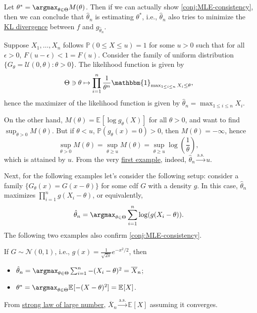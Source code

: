 Let \(\theta ^{\ast} = \argmax_{\theta \in \Theta } M(\theta )\). Then if we can actually show \autoref{conj:MLE-consistency}, then we can conclude that \(\hat{\theta} _n\) is estimating \(\theta ^{\ast} \), i.e., \(\hat{\theta} _n\) also tries to minimize the \href{https://en.wikipedia.org/wiki/Kullback%E2%80%93Leibler_divergence}{KL divergence} between \(f\) and \(g_{\hat{\theta} _n}\).

\begin{eg}
	Suppose \(X_1, \dots , X_n\) follows \(\mathbb{P} (0 \leq X \leq u) = 1\) for some \(u > 0\) such that for all \(\epsilon >0\), \(F(u - \epsilon ) < 1 = F(u)\). Consider the family of uniform distribution \(\{ G_\theta = \mathcal{U} (0, \theta ) \colon \theta > 0\} \). The likelihood function is given by
	\[
		\Theta \ni \theta
		\mapsto \prod_{i=1}^{n} \frac{1}{\theta ^n} \mathbbm{1}_{\max _{1 \leq i \leq n} X_i \leq \theta },
	\]
	hence the maximizer of the likelihood function is given by \(\hat{\theta} _n = \max _{1 \leq i \leq n} X_i\).

	On the other hand, \(M(\theta ) = \mathbb{E}_{}[\log g_\theta (X)] \) for all \(\theta  > 0\), and want to find \(\sup _{\theta > 0} M(\theta )\). But if \(\theta < u\), \(\mathbb{P} (g_\theta (x) = 0) > 0\), then \(M(\theta ) = -\infty \), hence
	\[
		\sup _{\theta > 0} M(\theta )
		= \sup _{\theta \geq u} M(\theta )
		= \sup _{\theta \geq u} \log (\frac{1}{\theta }),
	\]
	which is attained by \(u\). From the very \hyperref[eg:supremum-estimation]{first example}, indeed, \(\hat{\theta} _n \overset{\text{a.s.} }{\to} u\).
\end{eg}

Next, for the following examples let's consider the following setup: consider a family \(\{ G_\theta (x) = G(x - \theta ) \}\) for some cdf \(G\) with a density \(g\). In this case, \(\hat{\theta} _n\) maximizes \(\prod_{i=1}^{n} g(X_i - \theta )\), or equivalently,
\[
	\hat{\theta} _n
	= \argmax_{\theta \in \Theta } \sum_{i=1}^{n} \log (g(X_i - \theta )).
\]
The following two examples also confirm \autoref{conj:MLE-consistency}.

\begin{eg}[Normal]
	If \(G \sim \mathcal{N} (0, 1)\), i.e., \(g(x) = \frac{1}{\sqrt{2\pi } } e^{- x^2 / 2}\), then
	\begin{itemize}
		\item \(\hat{\theta} _n = \argmax_{\theta \in \Theta } \sum_{i=1}^{n} - (X_i - \theta )^2 = \overline{X} _n\);
		\item \(\theta ^{\ast} = \argmax_{\theta \in \Theta } \mathbb{E}_{}[-(X - \theta )^2] = \mathbb{E}_{}[X] \).
	\end{itemize}
	From \hyperref[thm:SLLN]{strong law of large number}, \(\overline{X} _n \overset{\text{a.s.} }{\to} \mathbb{E}_{}[X] \) assuming it converges.
\end{eg}

